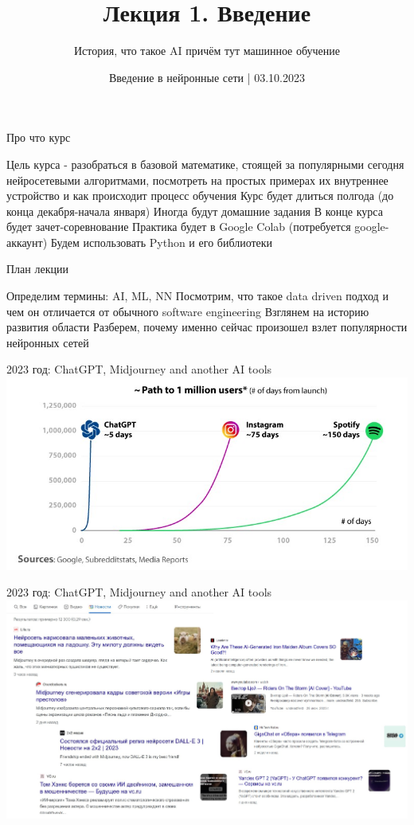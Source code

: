 \documentclass[aspectratio=169, professionalfonts]{beamer}
\title{Лекция 1. Введение}
\subtitle{История, что такое AI причём тут машинное обучение}
\date{Введение в нейронные сети | 03.10.2023}
\begin{document}
\maketitle


\begin{frame}{Про что курс}
    \begin{outline}
        \1 Цель курса - разобраться в базовой математике, стоящей за популярными сегодня
        нейросетевыми алгоритмами, посмотреть на простых примерах их внутреннее устройство
        и как происходит процесс обучения
        \1 Курс будет длиться полгода (до конца декабря-начала января)
        \1 Иногда будут домашние задания
        \1 В конце курса будет зачет-соревнование
        \1 Практика будет в Google Colab (потребуется google-аккаунт)
        \1 Будем использовать Python и его библиотеки
    \end{outline}
\end{frame}

\begin{frame}{План лекции}
    \begin{outline}
        \1 Определим термины: AI, ML, NN
        \1 Посмотрим, что такое data driven подход и чем он отличается от обычного
        software engineering
        \1 Взглянем на историю развития области
        \1 Разберем, почему именно сейчас произошел взлет популярности нейронных сетей
    \end{outline}
\end{frame}

\begin{frame}{2023 год: ChatGPT, Midjourney and another AI tools}
    \centering
    \includegraphics[width=.8\linewidth]{figures/fig0-chatgpt-growth.jpg}
\end{frame}

\begin{frame}{2023 год: ChatGPT, Midjourney and another AI tools}
    \centering
    \includegraphics[width=.85\linewidth]{figures/fig1-midjourney-news.jpg}
\end{frame}
\end{document}
